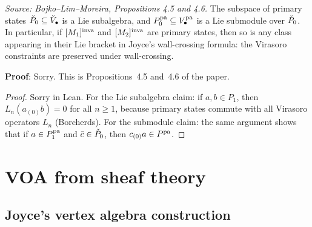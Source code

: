 \begin{theorem}[WallCrossingCompatibility]
  \label{thm:wall-crossing}
  \textit{Source: Bojko--Lim--Moreira, Propositions 4.5 and 4.6.}
  The subspace of primary states \(\widecheck{P}_0 \subseteq \widecheck{V}_\bullet\)
  is a Lie subalgebra, and \(P_0^\pa \subseteq V_\bullet^\pa\) is a Lie submodule
  over \(\widecheck{P}_0\). In particular, if \([M_1]^\inva\) and \([M_2]^\inva\)
  are primary states, then so is any class appearing in their Lie bracket in Joyce's
  wall-crossing formula: the Virasoro constraints are preserved under wall-crossing.

  \textbf{Proof}: Sorry. This is Propositions~4.5 and~4.6 of the paper.
\end{theorem}

\begin{proof}
  Sorry in Lean. For the Lie subalgebra claim: if \(a, b \in P_1\), then
  \(L_n(a_{(0)} b) = 0\) for all \(n \geq 1\), because primary states commute with
  all Virasoro operators \(L_n\) (Borcherds). For the submodule claim: the same
  argument shows that if \(a \in P_1^\pa\) and \(\bar{c} \in \widecheck{P}_0\), then
  \(c_{(0)} a \in P^\pa\).
\end{proof}

\section{VOA from sheaf theory}
\label{sec:virasoro-primary}

\subsection{Joyce's vertex algebra construction}

